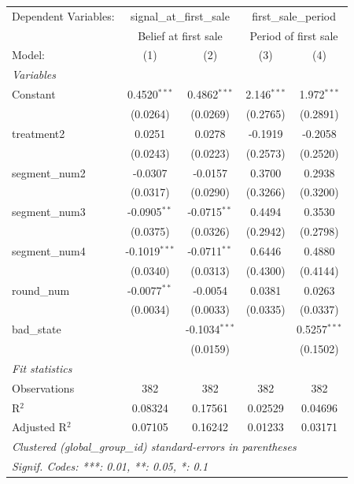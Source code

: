 
\begingroup
\centering
\scriptsize
\begin{tabular}{lcccc}
   \tabularnewline \midrule \midrule
   Dependent Variables: & \multicolumn{2}{c}{signal\_at\_first\_sale} & \multicolumn{2}{c}{first\_sale\_period}\\
    & \multicolumn{2}{c}{Belief at first sale} & \multicolumn{2}{c}{Period of first sale} \\ 
   Model:         & (1)             & (2)             & (3)           & (4)\\  
   \midrule
   \emph{Variables}\\
   Constant       & 0.4520$^{***}$  & 0.4862$^{***}$  & 2.146$^{***}$ & 1.972$^{***}$\\   
                  & (0.0264)        & (0.0269)        & (0.2765)      & (0.2891)\\   
   treatment2     & 0.0251          & 0.0278          & -0.1919       & -0.2058\\   
                  & (0.0243)        & (0.0223)        & (0.2573)      & (0.2520)\\   
   segment\_num2  & -0.0307         & -0.0157         & 0.3700        & 0.2938\\   
                  & (0.0317)        & (0.0290)        & (0.3266)      & (0.3200)\\   
   segment\_num3  & -0.0905$^{**}$  & -0.0715$^{**}$  & 0.4494        & 0.3530\\   
                  & (0.0375)        & (0.0326)        & (0.2942)      & (0.2798)\\   
   segment\_num4  & -0.1019$^{***}$ & -0.0711$^{**}$  & 0.6446        & 0.4880\\   
                  & (0.0340)        & (0.0313)        & (0.4300)      & (0.4144)\\   
   round\_num     & -0.0077$^{**}$  & -0.0054         & 0.0381        & 0.0263\\   
                  & (0.0034)        & (0.0033)        & (0.0335)      & (0.0337)\\   
   bad\_state     &                 & -0.1034$^{***}$ &               & 0.5257$^{***}$\\   
                  &                 & (0.0159)        &               & (0.1502)\\   
   \midrule
   \emph{Fit statistics}\\
   Observations   & 382             & 382             & 382           & 382\\  
   R$^2$          & 0.08324         & 0.17561         & 0.02529       & 0.04696\\  
   Adjusted R$^2$ & 0.07105         & 0.16242         & 0.01233       & 0.03171\\  
   \midrule \midrule
   \multicolumn{5}{l}{\emph{Clustered (global\_group\_id) standard-errors in parentheses}}\\
   \multicolumn{5}{l}{\emph{Signif. Codes: ***: 0.01, **: 0.05, *: 0.1}}\\
\end{tabular}
\par\endgroup


